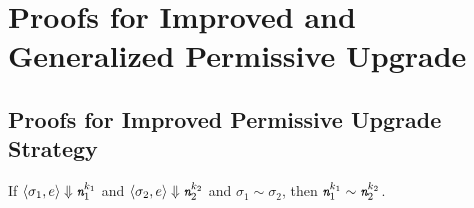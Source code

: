 \thispagestyle{empty}
\setcounter{myThm}{0}
\setcounter{myLemma}{0}
\setcounter{mydef}{0}
\setcounter{myaxiom}{0}
\setcounter{mycor}{0}
\setcounter{myprop}{0}

\section{Proofs for Improved and Generalized Permissive Upgrade}
\label{app:igpu}
\subsection{Proofs for Improved Permissive Upgrade Strategy}
\label{app:ipu}
\begin{myLemma}
\label{lem:app:gpu:expeval}
If $\langle \sigma_1, e \rangle \Downarrow \emph{\texttt{n}}_1^{k_1}$ and $\langle 
\sigma_2, e \rangle \Downarrow \emph{\texttt{n}}_2^{k_2}$ and $\sigma_1 \sim \sigma_2$,
then $\emph{\texttt{n}}_1^{k_1} \sim \emph{\texttt{n}}_2^{k_2}$.
\end{myLemma}
